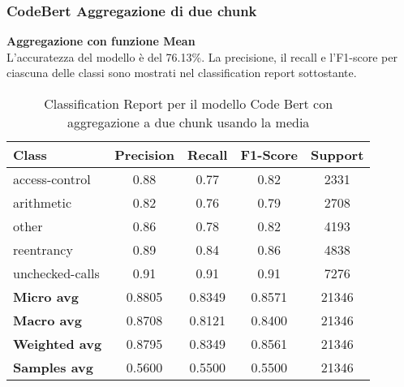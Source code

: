 \documentclass[../../Thesis.tex]{subfiles}
\begin{document}
\subsubsection{CodeBert Aggregazione di due chunk}
\textbf{Aggregazione con funzione Mean}\\
L'accuratezza del modello è del 76.13\%. La precisione, il recall e l'F1-score per ciascuna delle classi sono mostrati nel classification report sottostante.

\begin{table}[H]
    \centering
    \small
    \begin{tabular}{lcccc}
    \hline
    \textbf{Class} & \textbf{Precision} & \textbf{Recall} & \textbf{F1-Score} & \textbf{Support} \\
    \hline
    access-control & 0.88 & 0.77 & 0.82 & 2331 \\
    arithmetic & 0.82 & 0.76 & 0.79 & 2708 \\
    other & 0.86 & 0.78 & 0.82 & 4193 \\
    reentrancy & 0.89 & 0.84 & 0.86 & 4838 \\
    unchecked-calls & 0.91 & 0.91 & 0.91 & 7276 \\
    \hline
    \textbf{Micro avg} & 0.8805 & 0.8349 & 0.8571 & 21346 \\
    \textbf{Macro avg} & 0.8708 & 0.8121 & 0.8400 & 21346 \\
    \textbf{Weighted avg} & 0.8795 & 0.8349 & 0.8561 & 21346 \\
    \textbf{Samples avg} & 0.5600 & 0.5500 & 0.5500 & 21346 \\
    \hline
    \end{tabular}
    \caption{Classification Report per il modello Code Bert con aggregazione a due chunk usando la media}
    \end{table}
    
    
\end{document}
